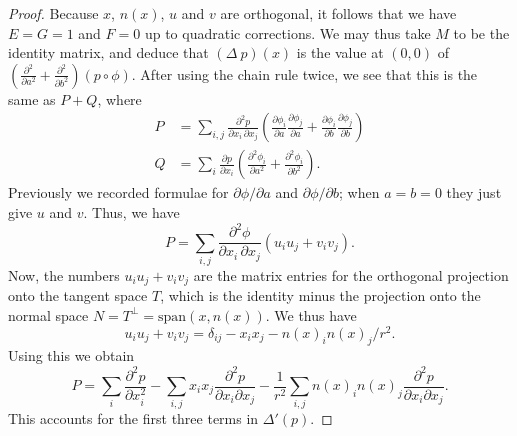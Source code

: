 \documentclass[reqno]{amsart}
\newcommand{\Dl}        {\Delta}
\newcommand{\dl}        {\delta}
\renewcommand{\:}{\colon}
\theoremstyle{definition}
\begin{document}
\begin{proof}
 Because $x$, $n(x)$, $u$ and $v$ are orthogonal, it follows that we
 have $E=G=1$ and $F=0$ up to quadratic corrections.  We may thus take
 $M$ to be the identity matrix, and deduce that $(\Delta\ p)(x)$ is
 the value at $(0,0)$ of
 $\left(\frac{\partial^2}{\partial a^2}+
        \frac{\partial^2}{\partial b^2}\right)(p\circ\phi)$.  After
 using the chain rule twice, we see that this is the same as $P+Q$,
 where
 \begin{align*}
  P &= \sum_{i,j} \frac{\partial^2p}{\partial x_i\,\partial x_j}
     \left(\frac{\partial\phi_i}{\partial a}
           \frac{\partial\phi_j}{\partial a}+
           \frac{\partial\phi_i}{\partial b}
           \frac{\partial\phi_j}{\partial b}\right) \\
  Q &=  \sum_{i} \frac{\partial p}{\partial x_i}
     \left(\frac{\partial^2\phi_i}{\partial a^2}+
           \frac{\partial^2\phi_i}{\partial b^2}\right).
 \end{align*}
 Previously we recorded formulae for
 $\partial\phi/\partial a$ and $\partial\phi/\partial b$; when $a=b=0$
 they just give $u$ and $v$.  Thus, we have
 \[ P = \sum_{i,j} \frac{\partial^2\phi}{\partial x_i\,\partial x_j}
     \left(u_iu_j+v_iv_j\right).
 \]
 Now, the numbers $u_iu_j+v_iv_j$ are the matrix entries for the
 orthogonal projection onto the tangent space $T$, which is the
 identity minus the projection onto the normal space
 $N=T^\perp=\text{span}(x,n(x))$.  We thus have
 \[ u_iu_j+v_iv_j=\dl_{ij} - x_ix_j - n(x)_in(x)_j/r^2. \]
 Using this we obtain
 \[ P = \sum_i \frac{\partial^2p}{\partial x_i^2}
    - \sum_{i,j} x_ix_j \frac{\partial^2p}{\partial x_i\partial x_j}
    - \frac{1}{r^2} \sum_{i,j} n(x)_i n(x)_j
         \frac{\partial^2p}{\partial x_i\partial x_j}.
 \]
 This accounts for the first three terms in $\Dl'(p)$.


\end{proof}
\end{document}

